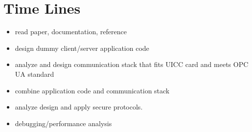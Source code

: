 \documentclass[]{llncs}
\begin{document}
\section{Time Lines}
 \begin{itemize}
  \item read paper, documentation, reference
  \item design dummy client/server application code 
  \item analyze and design communication stack that fits UICC card and meets OPC UA standard 
  \item combine application code and communication stack
  \item analyze design and apply secure protocols. 
  \item debugging/performance analysis
\end{itemize}



\end{document}
